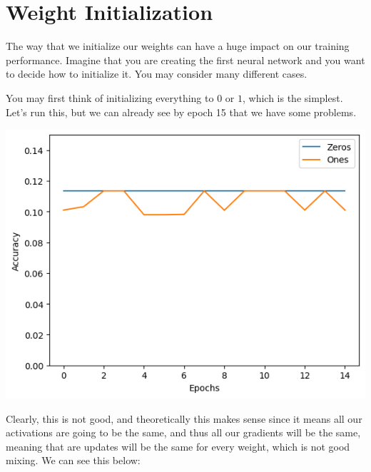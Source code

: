 \section{Weight Initialization}

  The way that we initialize our weights can have a huge impact on our training performance. Imagine that you are creating the first neural network and you want to decide how to initialize it. You may consider many different cases. 

  \begin{example}
    You may first think of initializing everything to $0$ or $1$, which is the simplest. Let's run this, but we can already see by epoch 15 that we have some problems. 
    \begin{center}
      \includegraphics[scale=0.5]{img/first_initialize.png}
    \end{center}
    Clearly, this is not good, and theoretically this makes sense since it means all our activations are going to be the same, and thus all our gradients will be the same, meaning that are updates will be the same for every weight, which is not good mixing. We can see this below: 
  \end{example}

